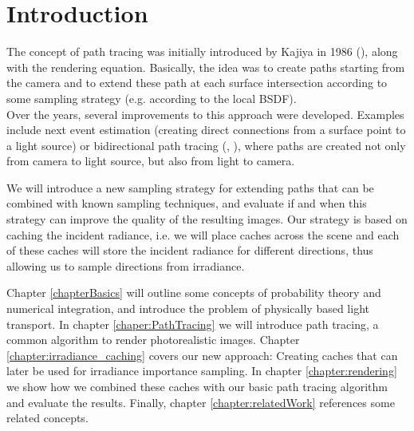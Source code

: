 \chapter{Introduction}

The concept of path tracing was initially introduced by Kajiya in 1986 (\cite{kajiya}), along with the rendering equation. Basically, the idea was to create paths starting from the camera and to extend these path at each surface intersection according to some sampling strategy (e.g. according to the local BSDF).\\
Over the years, several improvements to this approach were developed. Examples include next event estimation (creating direct connections from a surface point to a light source) or bidirectional path tracing (\cite{lafortune93}, \cite{lafortune96}), where paths are created not only from camera to light source, but also from light to camera. 

We will introduce a new sampling strategy for extending paths that can be combined with known sampling techniques, and evaluate if and when this strategy can improve the quality of the resulting images. Our strategy is based on caching the incident radiance, i.e. we will place caches across the scene and each of these caches will store the incident radiance for different directions, thus allowing us to sample directions from irradiance.

Chapter \ref{chapterBasics} will outline some concepts of probability theory and numerical integration, and introduce the problem of physically based light transport. In chapter \ref{chaper:PathTracing} we will introduce path tracing, a common algorithm to render photorealistic images. Chapter \ref{chapter:irradiance_caching} covers our new approach: Creating caches  that can later be used for irradiance importance sampling. In chapter \ref{chapter:rendering} we show how we combined these caches with our basic path tracing algorithm and evaluate the results. Finally, chapter \ref{chapter:relatedWork} references some related concepts.

